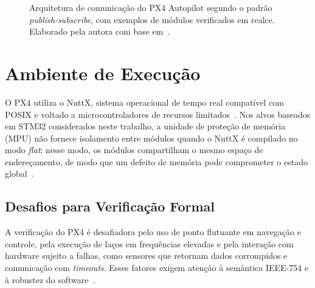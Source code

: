 \begin{figure}[ht]
{}
  \caption[Arquitetura de comunicação do PX4 Autopilot]{Arquitetura de comunicação do PX4 Autopilot segundo o padrão \textit{publish-subscribe}, com exemplos de módulos verificados em realce. Elaborado pela autora com base em~\cite{PX4_Documentation}.}
  \label{fig:px4_arquitetura}
\end{figure}

\section{Ambiente de Execução}
\label{sec:ambiente-execucao}

O PX4 utiliza o NuttX, sistema operacional de tempo real compatível com POSIX e voltado a microcontroladores de recursos limitados~\cite{NuttX}. Nos alvos baseados em STM32 considerados neste trabalho, a unidade de proteção de memória (MPU) não fornece isolamento entre módulos quando o NuttX é compilado no modo \textit{flat}: nesse modo, os módulos compartilham o mesmo espaço de endereçamento, de modo que um defeito de memória pode comprometer o estado global~\cite{NuttX}.

\subsection{Desafios para Verificação Formal}

A verificação do PX4 é desafiadora pelo uso de ponto flutuante em navegação e controle, pela execução de laços em frequências elevadas e pela interação com hardware sujeito a falhas, como sensores que retornam dados corrompidos e comunicação com \textit{timeouts}. Esses fatores exigem atenção à semântica IEEE-754 e à robustez do software~\cite{Wanner2024}.

